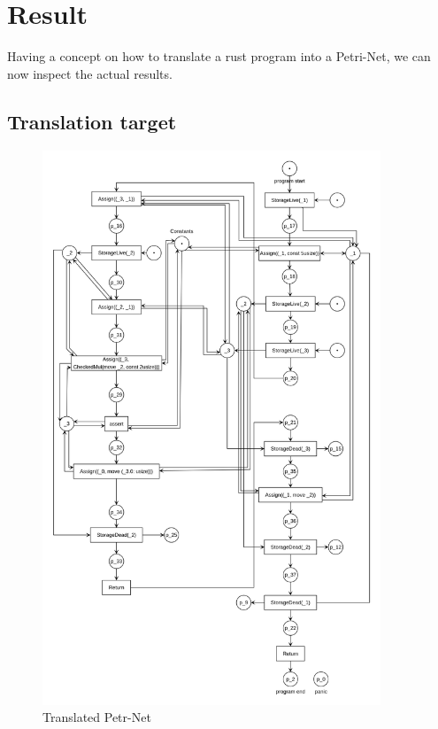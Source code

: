 \chapter{Result}
\label{results}
Having a concept on how to translate a rust program into a Petri-Net, we can now inspect the actual results.
\section{Translation target}
\begin{figure}
  \centering
  \includegraphics[width=0.9\textwidth]{../diagrams/FunctionCallNet.png}
  \caption{Translated Petr-Net}
  \label{function_call_net}
\end{figure}
